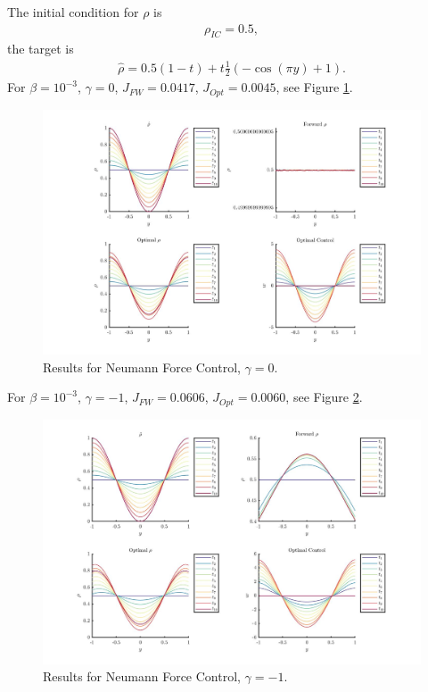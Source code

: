 \documentclass[11pt, a4paper]{article}
\theoremstyle{definition}
\begin{document}
The initial condition for $\rho$ is 
\begin{align*}
\rho_{IC} = 0.5,
\end{align*}
the target is
\begin{align*}
\hat \rho = 0.5(1-t) + t\frac{1}{2}(-\cos(\pi y) + 1).
\end{align*}
For $\beta = 10^{-3}$, $\gamma = 0$, $J_{FW} = 0.0417$, $J_{Opt} = 0.0045$, see Figure \ref{ResFN1}.
\begin{figure}[h]
	\includegraphics[scale=0.3]{ResFN1.jpg}
	\caption{Results for Neumann Force Control, $\gamma = 0$.}
	\label{ResFN1}
\end{figure}
For $\beta = 10^{-3}$, $\gamma = -1$, $J_{FW} = 0.0606$, $J_{Opt} = 0.0060$, see Figure \ref{ResFN1a}.
\begin{figure}[h]
	\includegraphics[scale=0.3]{ResFN1a.jpg}
	\caption{Results for Neumann Force Control, $\gamma = -1$.}
	\label{ResFN1a}
\end{figure}
\end{document}
